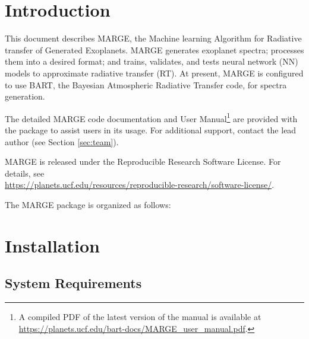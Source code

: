 \documentclass[letterpaper, 12pt]{article}
\begin{document}
\section{Introduction}
\label{sec:theory}

\noindent This document describes MARGE, the Machine learning Algorithm for Radiative 
transfer of Generated Exoplanets.  MARGE generates exoplanet spectra; processes 
them into a desired format; and trains, validates, and tests neural network (NN)
models to approximate radiative transfer (RT).  At present, MARGE is configured 
to use BART, the Bayesian Atmospheric Radiative Transfer code, for spectra 
generation.

The detailed MARGE code documentation and User Manual\footnote{A compiled PDF 
of the latest version of the manual is available at 
\href{https://planets.ucf.edu/bart-docs/MARGE\_user\_manual.pdf}{https://planets.ucf.edu/bart-docs/MARGE\_user\_manual.pdf}.} 
are provided with the package to assist users in its usage. 
For additional support, contact the lead author (see Section \ref{sec:team}).

MARGE is released under the Reproducible Research Software License.  
For details, see \\
\href{https://planets.ucf.edu/resources/reproducible-research/software-license/}{https://planets.ucf.edu/resources/reproducible-research/software-license/}.
\newline

\noindent The MARGE package is organized as follows: \newline
\noindent{}
\vspace{0.7cm}

\section{Installation}
\label{sec:installation}

\subsection{System Requirements}
\label{sec:requirements}
\end{document}
